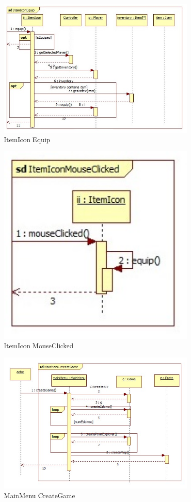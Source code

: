 \begin{figure}[H]
	\begin{center}
		\includegraphics[width=10cm]{chapters/chapter11/seq/ItemIcon_Equip.jpg}
		\caption{ItemIcon Equip}
		\label{ItemIcon Equip}
	\end{center}
\end{figure}
\begin{figure}[H]
	\begin{center}
		\includegraphics[width=10cm]{chapters/chapter11/seq/ItemIcon_MouseClicked.jpg}
		\caption{ItemIcon MouseClicked}
		\label{ItemIcon MouseClicked}
	\end{center}
\end{figure}
\begin{figure}[H]
	\begin{center}
		\includegraphics[width=10cm]{chapters/chapter11/seq/MainMenu_createGame.jpg}
		\caption{MainMenu CreateGame}
		\label{MainMenu CreateGame}
	\end{center}
\end{figure}
